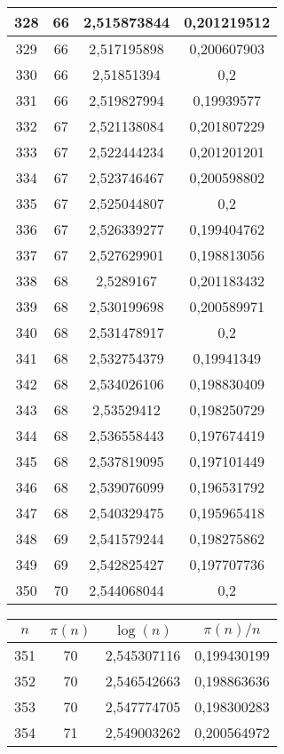 {\begin{minipage}[!h]{0.45\textwidth}
\begin{longtable}{cccc}
328 & 66 & 2,515873844 & 0,201219512 \\ \hline
329 & 66 & 2,517195898 & 0,200607903 \\ \hline
330 & 66 & 2,51851394 & 0,2 \\ \hline
331 & 66 & 2,519827994 & 0,19939577 \\ \hline
332 & 67 & 2,521138084 & 0,201807229 \\ \hline
333 & 67 & 2,522444234 & 0,201201201 \\ \hline
334 & 67 & 2,523746467 & 0,200598802 \\ \hline
335 & 67 & 2,525044807 & 0,2 \\ \hline
336 & 67 & 2,526339277 & 0,199404762 \\ \hline
337 & 67 & 2,527629901 & 0,198813056 \\ \hline
338 & 68 & 2,5289167 & 0,201183432 \\ \hline
339 & 68 & 2,530199698 & 0,200589971 \\ \hline
340 & 68 & 2,531478917 & 0,2 \\ \hline
341 & 68 & 2,532754379 & 0,19941349 \\ \hline
342 & 68 & 2,534026106 & 0,198830409 \\ \hline
343 & 68 & 2,53529412 & 0,198250729 \\ \hline
344 & 68 & 2,536558443 & 0,197674419 \\ \hline
345 & 68 & 2,537819095 & 0,197101449 \\ \hline
346 & 68 & 2,539076099 & 0,196531792 \\ \hline
347 & 68 & 2,540329475 & 0,195965418 \\ \hline
348 & 69 & 2,541579244 & 0,198275862 \\ \hline
349 & 69 & 2,542825427 & 0,197707736 \\ \hline
350 & 70 & 2,544068044 & 0,2 \\ \hline
\end{longtable}
\end{minipage}
\begin{minipage}[!h]{0.45\textwidth}\centering
\tiny
\begin{longtable}{cccc} \hline
\(n\) & \(\pi(n)\) & \(\log(n)\) & \(\pi(n)/n\) \\ \hline
351 & 70 & 2,545307116 & 0,199430199 \\ \hline
352 & 70 & 2,546542663 & 0,198863636 \\ \hline
353 & 70 & 2,547774705 & 0,198300283 \\ \hline
354 & 71 & 2,549003262 & 0,200564972 \\ \hline

\end{longtable}
\end{minipage}}
